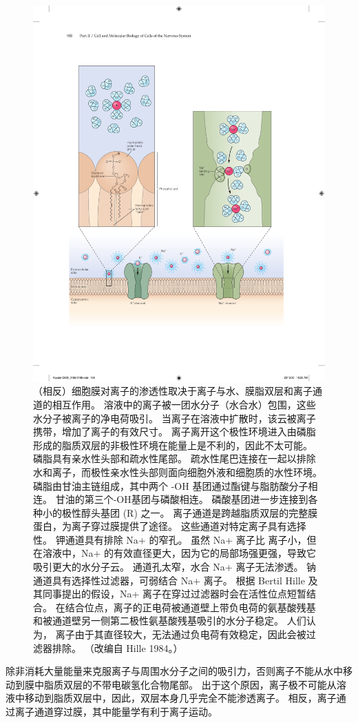 \begin{figure}[htbp]
	\centering
	\includegraphics[width=0.6\linewidth]{chap08/fig_8_1}
	\caption{（相反）细胞膜对离子的渗透性取决于离子与水、膜脂双层和离子通道的相互作用。 溶液中的离子被一团水分子（水合水）包围，这些水分子被离子的净电荷吸引。 当离子在溶液中扩散时，该云被离子携带，增加了离子的有效尺寸。 离子离开这个极性环境进入由磷脂形成的脂质双层的非极性环境在能量上是不利的，因此不太可能。 磷脂具有亲水性头部和疏水性尾部。 疏水性尾巴连接在一起以排除水和离子，而极性亲水性头部则面向细胞外液和细胞质的水性环境。 磷脂由甘油主链组成，其中两个 -OH 基团通过酯键与脂肪酸分子相连。 甘油的第三个-OH基团与磷酸相连。 磷酸基团进一步连接到各种小的极性醇头基团 (R) 之一。 离子通道是跨越脂质双层的完整膜蛋白，为离子穿过膜提供了途径。 这些通道对特定离子具有选择性。 钾通道具有排除 Na+ 的窄孔。 虽然 Na+ 离子比  离子小，但在溶液中，Na+ 的有效直径更大，因为它的局部场强更强，导致它吸引更大的水分子云。  通道孔太窄，水合 Na+ 离子无法渗透。 钠通道具有选择性过滤器，可弱结合 Na+ 离子。 根据 Bertil Hille 及其同事提出的假设，Na+ 离子在穿过过滤器时会在活性位点短暂结合。 在结合位点，离子的正电荷被通道壁上带负电荷的氨基酸残基和被通道壁另一侧第二极性氨基酸残基吸引的水分子稳定。 人们认为， 离子由于其直径较大，无法通过负电荷有效稳定，因此会被过滤器排除。 （改编自 Hille 1984。）}
	\label{fig:8_1}
\end{figure}


除非消耗大量能量来克服离子与周围水分子之间的吸引力，否则离子不能从水中移动到膜中脂质双层的不带电碳氢化合物尾部。
出于这个原因，离子极不可能从溶液中移动到脂质双层中，因此，双层本身几乎完全不能渗透离子。
相反，离子通过离子通道穿过膜，其中能量学有利于离子运动。


